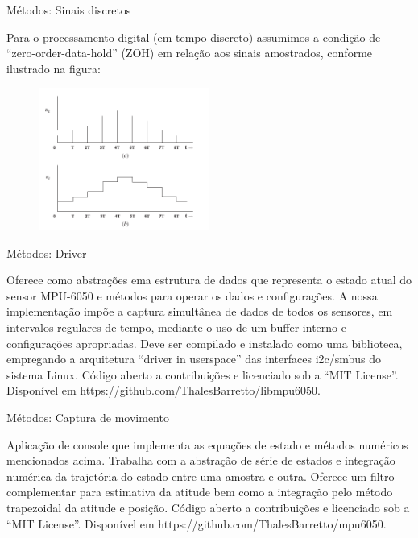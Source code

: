 \documentclass{beamer}
\begin{document}
\begin{frame}{Métodos: Sinais discretos}

    Para o processamento digital (em tempo discreto) assumimos a condição de  ``zero-order-data-hold'' (ZOH) em relação aos sinais amostrados, conforme ilustrado na figura:
\begin{figure}[H]
    \centering
    \includegraphics[width=0.5\textwidth, keepaspectratio]{figuras/figure7.2-2.png}\label{fig7.2-2}
\end{figure}

\end{frame}

\begin{frame}{Métodos: Driver}

    Oferece como abstrações ema estrutura de dados que representa o estado atual do sensor MPU-6050 e métodos para operar os dados e configurações. A nossa implementação impõe a captura simultânea de dados de todos os sensores, em intervalos regulares de tempo, mediante o uso de um buffer interno e configurações apropriadas.
    \vspace{12pt}
    Deve ser compilado e instalado como uma biblioteca, empregando a arquitetura ``driver in userspace'' das interfaces i2c/smbus do sistema Linux.
    \vspace{12pt}
    Código aberto a contribuições e licenciado sob a ``MIT License''.
    \vspace{12pt}
    Disponível em https://github.com/ThalesBarretto/libmpu6050.

\end{frame}

\begin{frame}{Métodos: Captura de movimento}

    Aplicação de console que implementa as equações de estado e métodos numéricos mencionados acima. Trabalha com a abstração de série de estados e integração numérica da trajetória do estado entre uma amostra e outra. Oferece um filtro complementar para estimativa da atitude bem como a integração pelo método trapezoidal da atitude e posição.
    \vspace{12pt}
    Código aberto a contribuições e licenciado sob a ``MIT License''.
    \vspace{12pt}
    Disponível em https://github.com/ThalesBarretto/mpu6050.

\end{frame}
\end{document}
